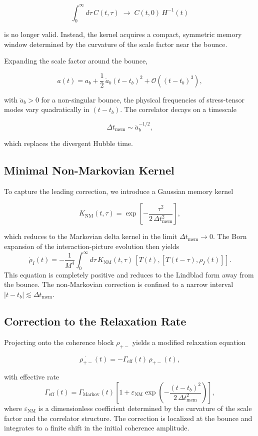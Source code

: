 \documentclass[11pt,a4paper]{article}
\newcommand{\rpm}{\rho_{+-}}
\begin{document}
\[
\int_{0}^{\infty} d\tau\, C(t,\tau)
    \;\rightarrow\;
C(t,0)\, H^{-1}(t)
\]


is no longer valid. Instead, the kernel acquires a compact, symmetric memory
window determined by the curvature of the scale factor near the bounce.

Expanding the scale factor around the bounce,


\[
a(t) = a_b + \frac{1}{2}\,\ddot{a}_b (t - t_b)^{2} + \mathcal{O}((t-t_b)^{3}),
\]


with \(\ddot{a}_b > 0\) for a non-singular bounce, the physical frequencies of
stress-tensor modes vary quadratically in \((t - t_b)\). The correlator decays
on a timescale


\[
\Delta t_{\mathrm{mem}} \sim \ddot{a}_b^{-1/2},
\]


which replaces the divergent Hubble time.

\subsection{Minimal Non-Markovian Kernel}

To capture the leading correction, we introduce a Gaussian memory kernel


\[
K_{\mathrm{NM}}(t,\tau)
    = \exp\!\left[
        -\frac{\tau^{2}}{2\,\Delta t_{\mathrm{mem}}^{2}}
      \right],
\]


which reduces to the Markovian delta kernel in the limit
\(\Delta t_{\mathrm{mem}} \to 0\). The Born expansion of the interaction-picture
evolution then yields
\begin{equation}
\dot{\rho}_{I}(t)
    = -\frac{1}{M^{4}}
      \int_{0}^{\infty}
      d\tau\,
      K_{\mathrm{NM}}(t,\tau)\,
      [T(t), [T(t-\tau), \rho_{I}(t)]].
\end{equation}
This equation is completely positive and reduces to the Lindblad form away from
the bounce. The non-Markovian correction is confined to a narrow interval
\(|t - t_b| \lesssim \Delta t_{\mathrm{mem}}\).

\subsection{Correction to the Relaxation Rate}

Projecting onto the coherence block \(\rpm\) yields a modified relaxation
equation


\[
\dot{\rpm}(t)
    = -\Gamma_{\mathrm{eff}}(t)\, \rpm(t),
\]


with effective rate
\begin{equation}
\Gamma_{\mathrm{eff}}(t)
    = \Gamma_{\mathrm{Markov}}(t)
      \left[
          1 + \varepsilon_{\mathrm{NM}}
              \exp\!\left(
                  -\frac{(t - t_b)^{2}}
                        {2\,\Delta t_{\mathrm{mem}}^{2}}
              \right)
      \right],
\end{equation}
where \(\varepsilon_{\mathrm{NM}}\) is a dimensionless coefficient determined by the
curvature of the scale factor and the correlator structure. The correction is
localized at the bounce and integrates to a finite shift in the initial
coherence amplitude.
\end{document}
